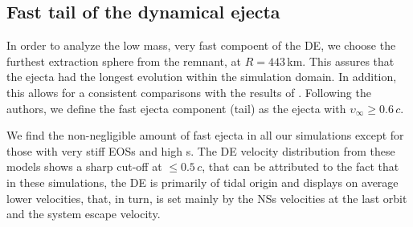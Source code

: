 \subsection{Fast tail of the dynamical ejecta} \label{sec:bns_sims:fast_de}


In order to analyze the low mass, very fast compoent of the \ac{DE}, we 
choose the furthest extraction sphere from the remnant, at 
$R = 443\,$km.  %
This assures that the ejecta had the longest evolution 
within the simulation domain. In addition, this allows for a consistent
comparisons with the results of \citet{Radice:2018pdn}.
%
Following the authors, we define the fast ejecta component (tail) 
as the ejecta with $\upsilon_{\infty}\geq0.6\,c$.

We find the non-negligible amount of fast ejecta in all our simulations 
except for those with very stiff \acp{EOS} and high \mr{}s. 
The \ac{DE} velocity distribution from these models shows a sharp cut-off at ${\leq}0.5\,c$, 
that can be attributed to the fact that in these simulations, the \ac{DE} 
is primarily of tidal origin and displays on average lower velocities, 
that, in turn, is set mainly by the \acp{NS} velocities at 
the last orbit and the system escape velocity. 

